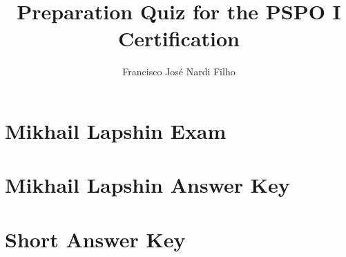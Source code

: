 \documentclass[a4paper,11pt]{article}
\begin{document}
\title{\bf{Preparation Quiz for the PSPO I Certification}}
\author{Francisco Jos\'e Nardi Filho}
\date{}
\maketitle
\section{Mikhail Lapshin Exam}

\newpage
\section{Mikhail Lapshin Answer Key}

\newpage
\section{Short Answer Key}

\end{document}
